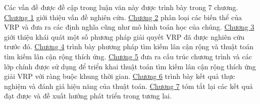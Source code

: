 Các vấn đề được đề cập trong luận văn này được trình bày trong 7 chương. \hyperref[chap:introduction]{Chương 1} giới thiệu vấn đề nghiên cứu. \hyperref[chap:model]{Chương 2} phân loại các biến thể của VRP và đưa ra các định nghĩa cũng như mô hình toán học của chúng.
\hyperref[chap:solution]{Chương 3} giới thiệu khái quát một số  phương pháp giải quyết VRP đã được nghiên cứu trước đó.
\hyperref[chap:search]{Chương 4}  trình bày phương pháp tìm kiếm lân cận rộng và thuật toán tìm kiếm lân cận rộng thích ứng.
\hyperref[chap:application]{Chương 5} đưa ra cấu trúc chương trình và các lớp chính được sử dụng để triển khai thuật toán tìm kiếm lân cận rộng thích ứng giải VRP với ràng buộc khung thời gian.
\hyperref[chap:experiment]{Chương 6} trình bày kết quả thực nghiệm và đánh giá hiệu năng của thuật toán.
\hyperref[chap:conclusion]{Chương 7} tóm tắt lại các kết quả đạt được và đề xuất hướng phát triển trong tương lai.
